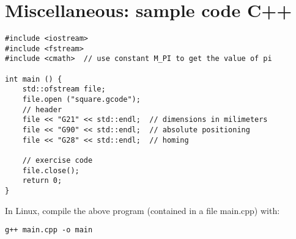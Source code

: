 \documentclass{article}
\begin{document}
\section{Miscellaneous: sample code C++}

\begin{verbatim}
#include <iostream>
#include <fstream>
#include <cmath>  // use constant M_PI to get the value of pi

int main () {
    std::ofstream file;
    file.open ("square.gcode");
    // header
    file << "G21" << std::endl;  // dimensions in milimeters
    file << "G90" << std::endl;  // absolute positioning
    file << "G28" << std::endl;  // homing

    // exercise code
    file.close();
    return 0;
}

\end{verbatim}

In Linux, compile the above program (contained in a file main.cpp) with:

\begin{verbatim}
g++ main.cpp -o main
\end{verbatim}
\end{document}
